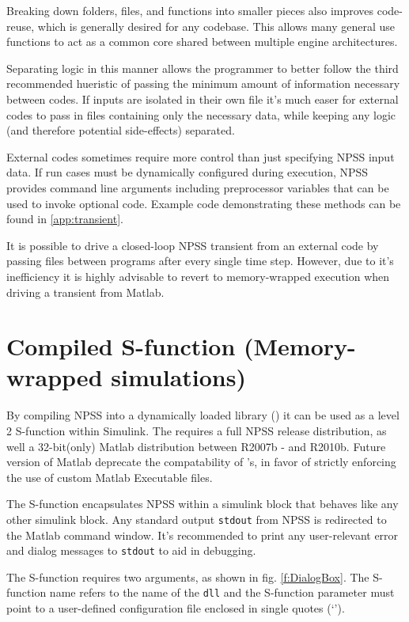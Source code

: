 \documentclass[heading.tex]{subfiles}
\begin{document}
Breaking down folders, files, and functions into smaller pieces also improves code-reuse,
which is generally desired for any codebase.
This allows many general use functions to act as a common core shared between multiple engine architectures.

Separating logic in this manner allows the programmer to better follow the third recommended hueristic
of passing the minimum amount of information necessary between codes. If inputs are isolated in their own file
it's much easer for external codes to pass in files containing only the necessary data, 
while keeping any logic (and therefore potential side-effects) separated.

External codes sometimes require more control than just specifying NPSS input data.
If run cases must be dynamically configured during execution,
NPSS provides command line arguments \cite[chap.~2.1]{NPSS}
including preprocessor variables that can be used to invoke optional code.
Example code demonstrating these methods can be found in \cref{app:transient}.

It is possible to drive a closed-loop NPSS transient from an external code
by passing files between programs after every single time step.
However, due to it's inefficiency it is highly advisable to revert to
memory-wrapped execution when driving a transient from Matlab.

\section{Compiled S-function (Memory-wrapped simulations)}

By compiling NPSS into a dynamically loaded library () it can be used as a
level 2 S-function within Simulink.
The  requires a full NPSS release distribution,
as well a 32-bit(only) Matlab distribution between R2007b - and R2010b.
Future version of Matlab deprecate the compatability of 's,
in favor of strictly enforcing the use of custom Matlab Executable  files.

The S-function encapsulates NPSS within a simulink block that behaves like any other
simulink block.
Any standard output \texttt{stdout} from NPSS is redirected to the Matlab command window. 
It's recommended to print any user-relevant error and dialog messages to \texttt{stdout} to aid in debugging.

The S-function requires two arguments, as shown in fig. \ref{f:DialogBox}.
The S-function name refers to the name of the \texttt{dll} and the S-function parameter must point
to a user-defined configuration file enclosed in single quotes (`').
\end{document}
